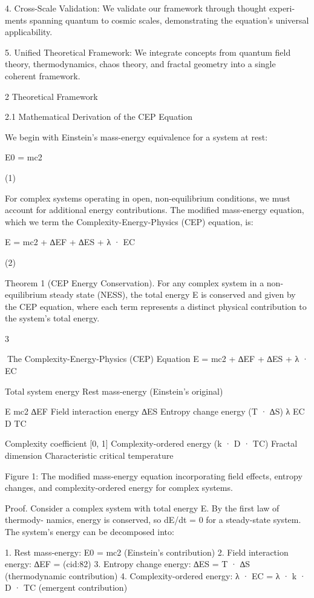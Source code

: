 4. Cross-Scale Validation: We validate our framework through thought experi-
ments spanning quantum to cosmic scales, demonstrating the equation’s universal
applicability.

5. Unified Theoretical Framework: We integrate concepts from quantum field
theory, thermodynamics, chaos theory, and fractal geometry into a single coherent
framework.

2 Theoretical Framework

2.1 Mathematical Derivation of the CEP Equation

We begin with Einstein’s mass-energy equivalence for a system at rest:

E0 = mc2

(1)

For complex systems operating in open, non-equilibrium conditions, we must account
for additional energy contributions. The modified mass-energy equation, which we term
the Complexity-Energy-Physics (CEP) equation, is:

E = mc2 + ∆EF + ∆ES + λ · EC

(2)

Theorem 1 (CEP Energy Conservation). For any complex system in a non-equilibrium
steady state (NESS), the total energy E is conserved and given by the CEP equation,
where each term represents a distinct physical contribution to the system’s total energy.

3

The Complexity-Energy-Physics (CEP) Equation
E = mc2 + ∆EF + ∆ES + λ · EC

Total system energy
Rest mass-energy (Einstein’s original)

E
mc2
∆EF Field interaction energy
∆ES Entropy change energy (T · ∆S)
λ
EC
D
TC

Complexity coefficient [0, 1]
Complexity-ordered energy (k · D · TC)
Fractal dimension
Characteristic critical temperature

Figure 1: The modified mass-energy equation incorporating field effects, entropy changes,
and complexity-ordered energy for complex systems.

Proof. Consider a complex system with total energy E. By the first law of thermody-
namics, energy is conserved, so dE/dt = 0 for a steady-state system. The system’s energy
can be decomposed into:

1. Rest mass-energy: E0 = mc2 (Einstein’s contribution)
2. Field interaction energy: ∆EF = (cid:82)
3. Entropy change energy: ∆ES = T · ∆S (thermodynamic contribution)
4. Complexity-ordered energy: λ · EC = λ · k · D · TC (emergent contribution)

